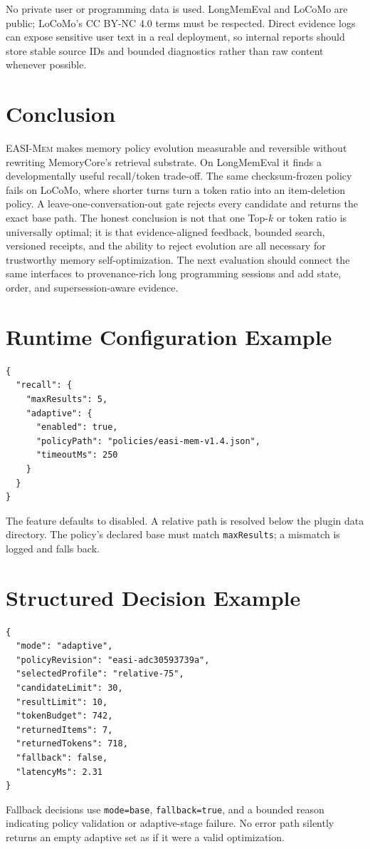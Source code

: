 \documentclass[10pt]{article}
\newcommand{\method}{\textsc{EASI-Mem}\xspace}
\newcommand{\code}[1]{\texttt{#1}}
\begin{document}
No private user or programming data is used. LongMemEval and LoCoMo are public;
LoCoMo's CC BY-NC 4.0 terms must be respected. Direct evidence logs can expose
sensitive user text in a real deployment, so internal reports should store
stable source IDs and bounded diagnostics rather than raw content whenever
possible.

\section{Conclusion}

\method makes memory policy evolution measurable and reversible without
rewriting MemoryCore's retrieval substrate. On LongMemEval it finds a
developmentally useful recall/token trade-off. The same checksum-frozen policy
fails on LoCoMo, where shorter turns turn a token ratio into an item-deletion
policy. A leave-one-conversation-out gate rejects every candidate and returns
the exact base path. The honest conclusion is not that one Top-$k$ or token
ratio is universally optimal; it is that evidence-aligned feedback, bounded
search, versioned receipts, and the ability to reject evolution are all
necessary for trustworthy memory self-optimization. The next evaluation should
connect the same interfaces to provenance-rich long programming sessions and
add state, order, and supersession-aware evidence.




\appendix
\section{Runtime Configuration Example}

\begin{verbatim}
{
  "recall": {
    "maxResults": 5,
    "adaptive": {
      "enabled": true,
      "policyPath": "policies/easi-mem-v1.4.json",
      "timeoutMs": 250
    }
  }
}
\end{verbatim}

The feature defaults to disabled. A relative path is resolved below the plugin
data directory. The policy's declared base must match \code{maxResults}; a
mismatch is logged and falls back.

\section{Structured Decision Example}

\begin{verbatim}
{
  "mode": "adaptive",
  "policyRevision": "easi-adc30593739a",
  "selectedProfile": "relative-75",
  "candidateLimit": 30,
  "resultLimit": 10,
  "tokenBudget": 742,
  "returnedItems": 7,
  "returnedTokens": 718,
  "fallback": false,
  "latencyMs": 2.31
}
\end{verbatim}

Fallback decisions use \code{mode=base}, \code{fallback=true}, and a bounded
reason indicating policy validation or adaptive-stage failure. No error path
silently returns an empty adaptive set as if it were a valid optimization.
\end{document}
